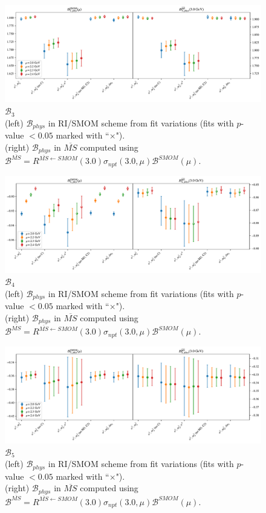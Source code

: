 \documentclass[12pt]{extarticle}
\begin{document}
\begin{figure}
\centering
\includegraphics[page=1, width=1.1\textwidth]{SSmPP/NPR/fit_summary_bag.pdf}
\caption{$\mathcal{B}_{3}$\\(left) $\mathcal{B}_{phys}$ in RI/SMOM scheme from fit variations (fits with $p$-value $<0.05$ marked with ``$\times$"). \\(right) $\mathcal{B}_{phys}$ in $\overline{MS}$ computed using $\mathcal{B}^{\overline{MS}} = R^{\overline{MS}\leftarrow SMOM}(3.0)\sigma_{npt}(3.0,\mu) \mathcal{B}^{SMOM}(\mu)$.}
\end{figure}
\clearpage
\begin{figure}
\centering
\includegraphics[page=1, width=1.1\textwidth]{SSpPP/NPR/fit_summary_bag.pdf}
\caption{$\mathcal{B}_{4}$\\(left) $\mathcal{B}_{phys}$ in RI/SMOM scheme from fit variations (fits with $p$-value $<0.05$ marked with ``$\times$"). \\(right) $\mathcal{B}_{phys}$ in $\overline{MS}$ computed using $\mathcal{B}^{\overline{MS}} = R^{\overline{MS}\leftarrow SMOM}(3.0)\sigma_{npt}(3.0,\mu) \mathcal{B}^{SMOM}(\mu)$.}
\end{figure}
\clearpage
\begin{figure}
\centering
\includegraphics[page=1, width=1.1\textwidth]{TT/NPR/fit_summary_bag.pdf}
\caption{$\mathcal{B}_{5}$\\(left) $\mathcal{B}_{phys}$ in RI/SMOM scheme from fit variations (fits with $p$-value $<0.05$ marked with ``$\times$"). \\(right) $\mathcal{B}_{phys}$ in $\overline{MS}$ computed using $\mathcal{B}^{\overline{MS}} = R^{\overline{MS}\leftarrow SMOM}(3.0)\sigma_{npt}(3.0,\mu) \mathcal{B}^{SMOM}(\mu)$.}
\end{figure}
\clearpage
\end{document}
